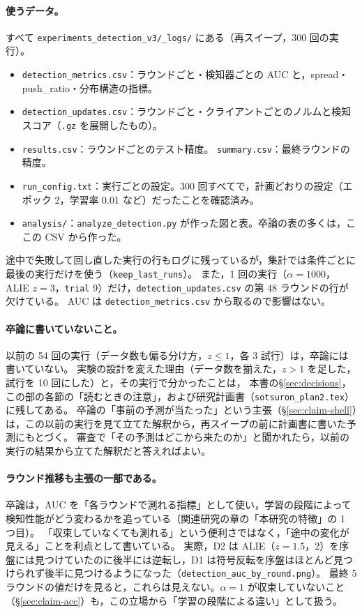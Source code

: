 \documentclass[a4j, dvipdfmx]{jsarticle}  %
\begin{document}
\paragraph{使うデータ。}
すべて \texttt{experiments\_detection\_v3/\_logs/} にある（再スイープ，300 回の実行）。
\begin{itemize}
  \item \texttt{detection\_metrics.csv}：ラウンドごと・検知器ごとの AUC と，spread・push\_ratio・分布構造の指標。
  \item \texttt{detection\_updates.csv}：ラウンドごと・クライアントごとのノルムと検知スコア（\texttt{.gz} を展開したもの）。
  \item \texttt{results.csv}：ラウンドごとのテスト精度。 \texttt{summary.csv}：最終ラウンドの精度。
  \item \texttt{run\_config.txt}：実行ごとの設定。300 回すべてで，計画どおりの設定（エポック 2，学習率 0.01 など）だったことを確認済み。
  \item \texttt{analysis/}：\texttt{analyze\_detection.py} が作った図と表。卒論の表の多くは，ここの CSV から作った。
\end{itemize}
途中で失敗して回し直した実行の行もログに残っているが，集計では条件ごとに最後の実行だけを使う（\texttt{keep\_last\_runs}）。
また，1 回の実行（$\alpha = 1000$，ALIE $z = 3$，\texttt{trial} 9）だけ，\texttt{detection\_updates.csv} の第 48 ラウンドの行が欠けている。
AUC は \texttt{detection\_metrics.csv} から取るので影響はない。

\paragraph{卒論に書いていないこと。}
以前の 54 回の実行（データ数も偏る分け方，$z \le 1$，各 3 試行）は，卒論には書いていない。
実験の設計を変えた理由（データ数を揃えた，$z > 1$ を足した，試行を 10 回にした）と，その実行で分かったことは，
本書の\S\ref{sec:decisions}，この部の各節の「読むときの注意」，および研究計画書（\texttt{sotsuron\_plan2.tex}）に残してある。
卒論の「事前の予測が当たった」という主張（\S\ref{sec:claim-shell}）は，この以前の実行を見て立てた解釈から，再スイープの前に計画書に書いた予測にもとづく。
審査で「その予測はどこから来たのか」と聞かれたら，以前の実行の結果から立てた解釈だと答えればよい。

\paragraph{ラウンド推移も主張の一部である。}
卒論は，AUC を「各ラウンドで測れる指標」として使い，学習の段階によって検知性能がどう変わるかを追っている（関連研究の章の「本研究の特徴」の 1 つ目）。
「収束していなくても測れる」という便利さではなく，「途中の変化が見える」ことを利点として書いている。
実際，D2 は ALIE（$z = 1.5$，2）を序盤には見つけていたのに後半には逆転し，D1 は符号反転を序盤はほとんど見つけられず後半に見つけるようになった（\texttt{detection\_auc\_by\_round.png}）。
最終 5 ラウンドの値だけを見ると，これらは見えない。$\alpha = 1$ が収束していないこと（\S\ref{sec:claim-acc}）も，この立場から「学習の段階による違い」として扱う。
\end{document}
